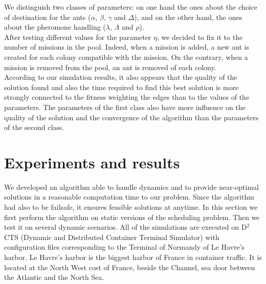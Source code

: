 \documentclass[a4paper,10pt]{article}
\begin{document}
We distinguish two classes of parameters: on one hand the ones about the choice of destination for the ants ($\alpha$, $\beta$, $\gamma$ and $\Delta$), and on the other hand, the ones about the pheromone handling ($\lambda$, $\Lambda$ and $\rho$).\\

After testing different values for the parameter $\eta$, we decided to fix it to the number of missions in the pool. Indeed, when a mission is added, a new ant is created for each colony compatible with the mission. On the contrary, when a mission is removed from the pool, an ant is removed of each colony.\\

According to our simulation results, it also appears that the quality of the solution found and also the time required to find this best solution is more strongly connected to the fitness weighting the edges than to the values of the parameters. The parameters of the first class also have more influence on the quality of the solution and the convergence of the algorithm than the parameters of the second class.

\section{Experiments and results}\label{sec:expe}
   We developed an algorithm able to handle dynamics and to provide near-optimal solutions in a reasonable computation time to our problem. Since the algorithm had also to be failsafe, it ensures feasible solutions at anytime. In this section we first perform the algorithm on static versions of the scheduling problem. Then we test it on several dynamic scenarios.
   All of the simulations are executed on D$^2$CTS (Dynamic and Distributed Container Terminal Simulator)\cite{Lesauvage2011} with configuration files corresponding to the Terminal of Normandy of Le Havre's harbor. Le Havre’s harbor is the biggest harbor of France in container traffic. It is located at the North West cost of France, beside the Channel, sea door between the Atlantic and the North Sea.

\end{document}
